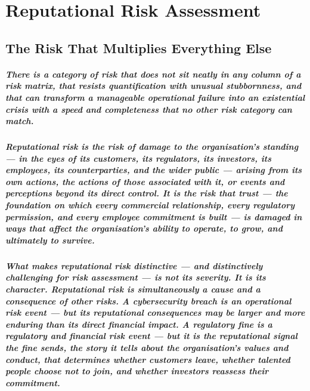 \chapter{Reputational Risk Assessment}
\label{chap:Reputational Risk Assessment}

\section{The Risk That Multiplies Everything Else}
\paragraph{There is a category of risk that does not sit neatly in any column of a risk matrix, that resists quantification with unusual stubbornness, and that can transform a manageable operational failure into an existential crisis with a speed and completeness that no other risk category can match.}
\paragraph{Reputational risk is the risk of damage to the organisation's standing — in the eyes of its customers, its regulators, its investors, its employees, its counterparties, and the wider public — arising from its own actions, the actions of those associated with it, or events and perceptions beyond its direct control. It is the risk that trust — the foundation on which every commercial relationship, every regulatory permission, and every employee commitment is built — is damaged in ways that affect the organisation's ability to operate, to grow, and ultimately to survive.}
\paragraph{What makes reputational risk distinctive — and distinctively challenging for risk assessment — is not its severity. It is its character. Reputational risk is simultaneously a cause and a consequence of other risks. A cybersecurity breach is an operational risk event — but its reputational consequences may be larger and more enduring than its direct financial impact. A regulatory fine is a regulatory and financial risk event — but it is the reputational signal the fine sends, the story it tells about the organisation's values and conduct, that determines whether customers leave, whether talented people choose not to join, and whether investors reassess their commitment.}
